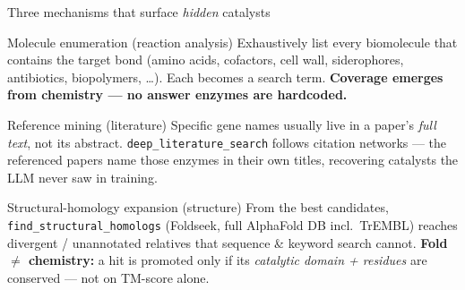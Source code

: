 \documentclass[aspectratio=169, 11pt]{beamer}
\begin{document}
\begin{frame}{Three mechanisms that surface \emph{hidden} catalysts}
  \begin{block}{Molecule enumeration \hfill {\normalfont\scriptsize(reaction analysis)}}
    \footnotesize
    Exhaustively list every biomolecule that contains the target bond (amino acids,
    cofactors, cell wall, siderophores, antibiotics, biopolymers, \dots). Each
    becomes a search term. \textbf{Coverage emerges from chemistry --- no answer
    enzymes are hardcoded.}
  \end{block}
  \begin{block}{Reference mining \hfill {\normalfont\scriptsize(literature)}}
    \footnotesize
    Specific gene names usually live in a paper's \emph{full text}, not its abstract.
    \texttt{deep\_literature\_search} follows citation networks --- the referenced
    papers name those enzymes in their own titles, recovering catalysts the LLM never saw in training.
  \end{block}
  \begin{alertblock}{Structural-homology expansion \hfill {\normalfont\scriptsize(structure)}}
    \footnotesize
    From the best candidates, \texttt{find\_structural\_homologs} (Foldseek, full
    AlphaFold DB incl.\ TrEMBL) reaches divergent / unannotated relatives that
    sequence \& keyword search cannot. \textbf{Fold $\neq$ chemistry:} a hit is
    promoted only if its \emph{catalytic domain + residues} are conserved --- not on
    TM-score alone.
  \end{alertblock}
\end{frame}
\end{document}

